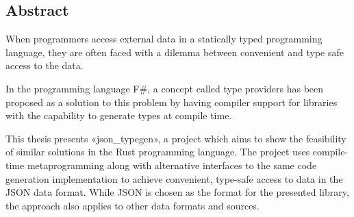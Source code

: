 
\vspace*{2cm}
\thispagestyle{plain}

\begin{center}

\section*{\hfil Abstract \hfil}

\end{center}

When programmers access external data in a statically typed programming language, they are often faced with a dilemma between convenient and type safe access to the data.

In the programming language F\#, a concept called type providers has been proposed as a solution to this problem by having compiler support for libraries with the capability to generate types at compile time.

This thesis presents «json_typegen», a project which aims to show the feasibility of similar solutions in the Rust programming language. The project uses compile-time metaprogramming along with alternative interfaces to the same code generation implementation to achieve convenient, type-safe access to data in the JSON data format. While JSON is chosen as the format for the presented library, the approach also applies to other data formats and sources.
